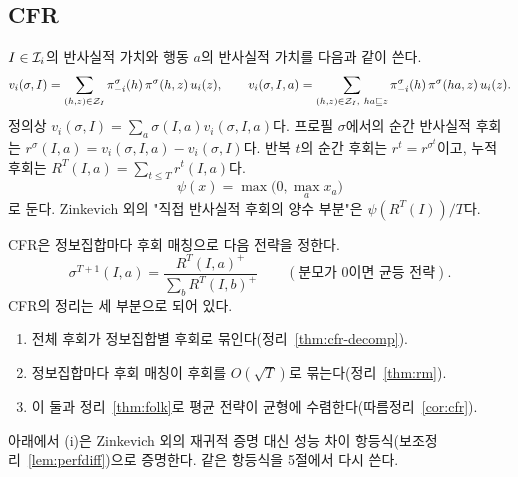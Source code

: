 \subsection{CFR}\label{sec:bg-cfr}
\begin{definition}
$I\in\mathcal{I}_i$의 반사실적 가치와 행동 $a$의 반사실적 가치를 다음과 같이 쓴다.
\[
v_i(\sigma,I)=\sum_{(h,z)\in\mathcal{Z}_I}\pi^\sigma_{-i}(h)\,\pi^\sigma(h,z)\,u_i(z),\qquad
v_i(\sigma,I,a)=\sum_{(h,z)\in\mathcal{Z}_I,\ ha\sqsubseteq z}\pi^\sigma_{-i}(h)\,\pi^\sigma(ha,z)\,u_i(z).
\]
정의상 $v_i(\sigma,I)=\sum_a\sigma(I,a)v_i(\sigma,I,a)$다.
프로필 $\sigma$에서의 순간 반사실적 후회는 $r^\sigma(I,a)=v_i(\sigma,I,a)-v_i(\sigma,I)$다.
반복 $t$의 순간 후회는 $r^t=r^{\sigma^t}$이고, 누적 후회는 $R^T(I,a)=\sum_{t\le T}r^t(I,a)$다.
\[
\psi(x)=\max\big(0,\max_ax_a\big)
\]
로 둔다. Zinkevich 외의 "직접 반사실적 후회의 양수 부분"은 $\psi(R^T(I))/T$다.
\end{definition}

CFR은 정보집합마다 후회 매칭으로 다음 전략을 정한다.
\begin{equation}\label{eq:rm}
\sigma^{T+1}(I,a)=\frac{R^T(I,a)^+}{\sum_bR^T(I,b)^+}\qquad(\text{분모가 0이면 균등 전략}).
\end{equation}
CFR의 정리는 세 부분으로 되어 있다.
\begin{enumerate}[label=(\roman*)]
  \item 전체 후회가 정보집합별 후회로 묶인다(정리~\ref{thm:cfr-decomp}).
  \item 정보집합마다 후회 매칭이 후회를 $O(\sqrt T)$로 묶는다(정리~\ref{thm:rm}).
  \item 이 둘과 정리~\ref{thm:folk}로 평균 전략이 균형에 수렴한다(따름정리~\ref{cor:cfr}).
\end{enumerate}
아래에서 (i)은 Zinkevich 외의 재귀적 증명 대신 성능 차이 항등식(보조정리~\ref{lem:perfdiff})으로 증명한다. 같은 항등식을 5절에서 다시 쓴다.

